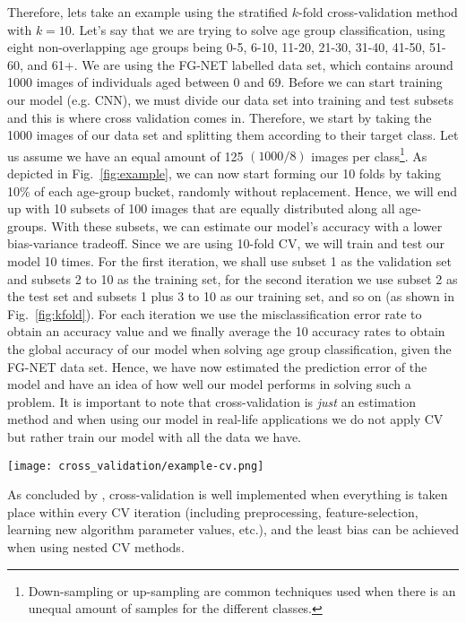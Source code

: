 Therefore, lets take an example using the stratified $k$-fold cross-validation method with $k=10$. Let's say that we are trying to solve age group classification, using eight non-overlapping age groups being 0-5, 6-10, 11-20, 21-30, 31-40, 41-50, 51-60, and 61+. We are using the FG-NET labelled data set, which contains around 1000 images of individuals aged between 0 and 69. Before we can start training our model (e.g. CNN), we must divide our data set into training and test subsets and this is where cross validation comes in. Therefore, we start by taking the 1000 images of our data set and splitting them according to their target class. Let us assume we have an equal amount of 125 $(1000/8)$ images per class\footnote{Down-sampling or up-sampling are common techniques used when there is an unequal amount of samples for the different classes.}. As depicted in Fig.~\ref{fig:example}, we can now start forming our 10 folds by taking 10\% of each age-group bucket, randomly without replacement. Hence, we will end up with 10 subsets of 100 images that are equally distributed along all age-groups. With these subsets, we can estimate our model's accuracy with a lower bias-variance tradeoff. Since we are using 10-fold CV, we will train and test our model 10 times. For the first iteration, we shall use subset 1 as the validation set and subsets 2 to 10 as the training set, for the second iteration we use subset 2 as the test set and subsets 1 plus 3 to 10 as our training set, and so on (as shown in Fig.~\ref{fig:kfold}). For each iteration we use the misclassification error rate to obtain an accuracy value and we finally average the 10 accuracy rates to obtain the global accuracy of our model when solving age group classification, given the FG-NET data set. Hence, we have now estimated the prediction error of the model and have an idea of how well our model performs in solving such a problem. It is important to note that cross-validation is \textit{just} an estimation method and when using our model in real-life applications we do not apply CV but rather train our model with all the data we have.

\begin{figure*}
\centering
  \texttt{[image: cross\_validation/example-cv.png]}
  \caption{Stratified 10-fold cross-validation on 1000 labelled images of 8 different classes}
  \label{fig:example}
\end{figure*}

As concluded by \citep{varma2006bias}, cross-validation is well implemented when everything is taken place within every CV iteration (including preprocessing, feature-selection, learning new algorithm parameter values, etc.), and the least bias can be achieved when using nested CV methods.